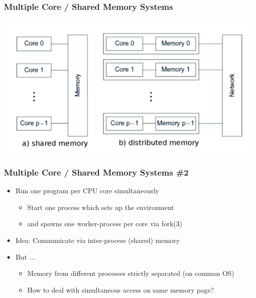 \documentclass[10pt]{beamer}
\begin{document}
\begin{frame}
        \frametitle{Multiple Core / Shared Memory Systems}
        \vspace{0.5cm}
        \includegraphics[width=\textwidth]{pictures/smdm.png} \\
\end{frame}


\begin{frame}
        \frametitle{Multiple Core / Shared Memory Systems \#2}
        \begin{itemize}
                \item Run one program per CPU core simultaneously
                \begin{itemize}
                        \item Start one process which sets up the environment
                        \item and spawns one worker-process per core via fork(3)
                \end{itemize}
                \item Idea: Communicate via inter-process (shared) memory
                \item But $\ldots$
                \begin{itemize}
                        \item Memory from different processes strictly separated (on common OS)
                        \item How to deal with simultaneous access on same memory page?
                \end{itemize}
        \end{itemize}
\end{frame}
\end{document}
